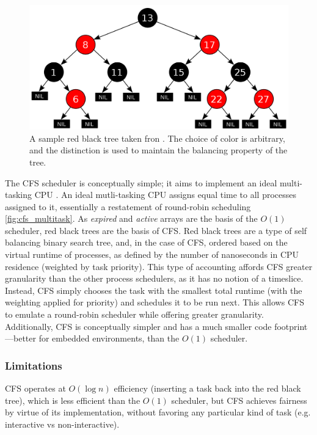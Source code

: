 \documentclass{sig-alternate-10pt}
\begin{document}
\begin{figure}
	\begin{center}
		\includegraphics[width=0.9\linewidth]{fig/rbtree.png}
		\caption{
			A sample red black tree taken fron \protect\cite{wiki:rbtree}. The choice of color is arbitrary, and the distinction is used to maintain the balancing property of the tree.
		}
		\label{fig:rbtree}
	\end{center}
\end{figure}

The CFS scheduler is conceptually simple; it aims to implement an ideal
multi-tasking CPU \cite{cfsdesign}. An ideal mutli-tasking CPU assigns equal
time to all processes assigned to it, essentially a restatement of
round-robin scheduling \ref{fig:cfs_multitask}. As \emph{expired} and
\emph{active} arrays are the basis of the $ O(1) $ scheduler, red black
trees are the basis of CFS. Red black trees are a type of self balancing
binary search tree, and, in the case of CFS, ordered based on the virtual
runtime of processes, as defined by the number of nanoseconds in CPU
residence (weighted by task priority). This type of accounting affords CFS
greater granularity than the other process schedulers, as it has no notion
of a timeslice. Instead, CFS simply chooses the task with the smallest total
runtime (with the weighting applied for priority) and schedules it to be run
next. This allows CFS to emulate a round-robin scheduler while offering
greater granularity. Additionally, CFS is conceptually simpler and has
a much smaller code footprint---better for embedded environments, than the
$ O(1) $ scheduler.

\subsubsection{Limitations}
CFS operates at $ O\left(\log n\right) $ efficiency (inserting
a task back into the red black tree), which is less efficient than the
$ O(1) $ scheduler, but CFS achieves fairness by virtue of its
implementation, without favoring any particular kind of task (e.g.
interactive vs non-interactive).
\end{document}
